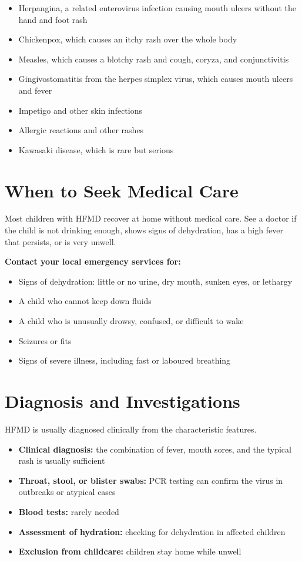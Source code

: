 \begin{itemize}
    \item Herpangina, a related enterovirus infection causing mouth ulcers without the hand and foot rash
    \item Chickenpox, which causes an itchy rash over the whole body
    \item Measles, which causes a blotchy rash and cough, coryza, and conjunctivitis
    \item Gingivostomatitis from the herpes simplex virus, which causes mouth ulcers and fever
    \item Impetigo and other skin infections
    \item Allergic reactions and other rashes
    \item Kawasaki disease, which is rare but serious
\end{itemize}

\section*{When to Seek Medical Care}
Most children with HFMD recover at home without medical care. See a doctor if the child is not drinking enough, shows signs of dehydration, has a high fever that persists, or is very unwell.

\textbf{Contact your local emergency services for:}
\begin{itemize}
    \item Signs of dehydration: little or no urine, dry mouth, sunken eyes, or lethargy
    \item A child who cannot keep down fluids
    \item A child who is unusually drowsy, confused, or difficult to wake
    \item Seizures or fits
    \item Signs of severe illness, including fast or laboured breathing
\end{itemize}

\section*{Diagnosis and Investigations}
HFMD is usually diagnosed clinically from the characteristic features.

\begin{itemize}
    \item \textbf{Clinical diagnosis:} the combination of fever, mouth sores, and the typical rash is usually sufficient
    \item \textbf{Throat, stool, or blister swabs:} PCR testing can confirm the virus in outbreaks or atypical cases
    \item \textbf{Blood tests:} rarely needed
    \item \textbf{Assessment of hydration:} checking for dehydration in affected children
    \item \textbf{Exclusion from childcare:} children stay home while unwell
\end{itemize}

